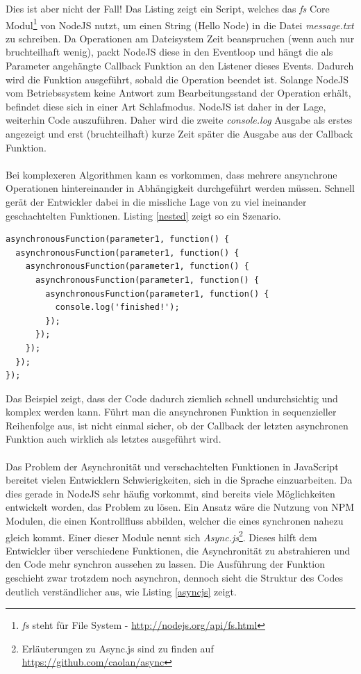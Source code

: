 Dies ist aber nicht der Fall! Das Listing zeigt ein Script, welches das \textit{fs} Core Modul\footnote{\textit{fs} steht für File System - \url{http://nodejs.org/api/fs.html}} von NodeJS nutzt, um einen String (\glqq Hello Node\grqq{}) in die Datei \textit{message.txt} zu schreiben. Da Operationen am Dateisystem Zeit beanspruchen (wenn auch nur bruchteilhaft wenig), packt NodeJS diese in den Eventloop und hängt die als Parameter angehängte Callback Funktion an den Listener dieses Events. Dadurch wird die Funktion ausgeführt, sobald die Operation beendet ist. Solange NodeJS vom Betriebssystem keine Antwort zum Bearbeitungsstand der Operation erhält, befindet diese sich in einer Art Schlafmodus. NodeJS ist daher in der Lage, weiterhin Code auszuführen. Daher wird die zweite \textit{console.log} Ausgabe als erstes angezeigt und erst (bruchteilhaft) kurze Zeit später die Ausgabe aus der Callback Funktion.\\
\\
Bei komplexeren Algorithmen kann es vorkommen, dass mehrere ansynchrone Operationen hintereinander in Abhängigkeit durchgeführt werden müssen. Schnell gerät der Entwickler dabei in die missliche Lage von zu viel ineinander geschachtelten Funktionen. Listing \ref{nested} zeigt so ein Szenario.

\vspace{0.6cm}
\begin{lstlisting}[caption=\glqq Pyramid of Doom\grqq{} - Undurchsichtiger und unsauberer Code durch zu viele verschachtelte Funktionen,label=nested]
asynchronousFunction(parameter1, function() {
  asynchronousFunction(parameter1, function() {
    asynchronousFunction(parameter1, function() {
      asynchronousFunction(parameter1, function() {
        asynchronousFunction(parameter1, function() {
          console.log('finished!');
        });
      });
    });
  });
});
\end{lstlisting}

Das Beispiel zeigt, dass der Code dadurch ziemlich schnell undurchsichtig und komplex werden kann. Führt man die ansynchronen Funktion in sequenzieller Reihenfolge aus, ist nicht einmal sicher, ob der Callback der letzten asynchronen Funktion auch wirklich als letztes ausgeführt wird.\\
\\
Das Problem der Asynchronität und verschachtelten Funktionen in JavaScript bereitet vielen Entwicklern Schwierigkeiten, sich in die Sprache einzuarbeiten. Da dies gerade in NodeJS sehr häufig vorkommt, sind bereits viele Möglichkeiten entwickelt worden, das Problem zu lösen. Ein Ansatz wäre die Nutzung von NPM Modulen, die einen Kontrollfluss abbilden, welcher die eines synchronen nahezu gleich kommt. Einer dieser Module nennt sich \textit{Async.js}\footnote{Erläuterungen zu Async.js sind zu finden auf \url{https://github.com/caolan/async}}. Dieses hilft dem Entwickler über verschiedene Funktionen, die Asynchronität zu abstrahieren und den Code mehr synchron aussehen zu lassen. Die Ausführung der Funktion geschieht zwar trotzdem noch asynchron, dennoch sieht die Struktur des Codes deutlich verständlicher aus, wie Listing \ref{asyncjs} zeigt.


